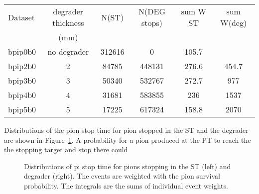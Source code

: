 \begin{table}[H]
\begin{tabularx}{1.0\textwidth} {|X|c|c|c|c|c|}  %
  \hline
  Dataset             & degrader thickness & N(ST)       & N(DEG stops) & sum W ST  & sum W(deg)   \\
                      & (mm)               &             &              &           &              \\
  \hline                                                                                          
  bpip0b0             &  no degrader       &   312616    &     0        &   105.7   &              \\
  \hline                                                                                          
  bpip2b0             &     2              &   84785     &   448131     &   276.6   &   454.7      \\
  \hline                                                                                          
  bpip3b0             &     3              &   50340     &   532767     &  272.7    &   977        \\
  \hline                                                                                        
  bpip4b0             &     4              &   31681     &   583855     &  236      &  1537        \\
  \hline                                                                                          
  bpip5b0             &     5              &   17225     &   617324     &  158.8    &   2070       \\
  \hline
\end{tabularx}
\end{table}

Distributions of the pion stop time for pion stopped in the ST and the degrader are shown
in Figure~\ref{fig:pion_stop_time}. A probability for a pion produced at the PT to reach the
the stopping target and stop there could 

\begin{figure}[H]
  \caption{
    \label{fig:pion_stop_time}
    Distributions of pi stop time for pions stopping in the ST (left) and degrader (right).
    The events are weighted with the pion survival probability.
    The integrals are the sums of individual event weights.
  }
\end{figure}


